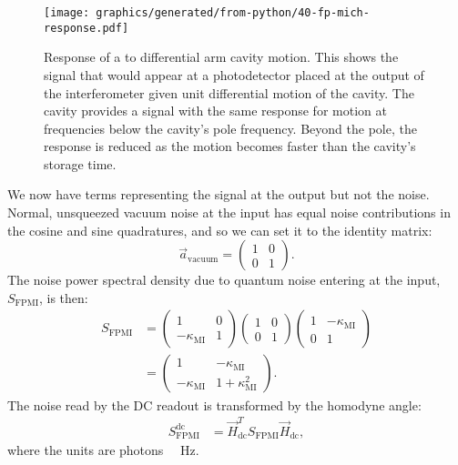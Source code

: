 \begin{figure}
  \centering
  \texttt{[image: graphics/generated/from-python/40-fp-mich-response.pdf]}
  \caption[Response of a \FPMI{} to differential arm cavity motion]{\label{fig:fp-mich-response}Response of a \FPMI{} to differential arm cavity motion. This shows the signal that would appear at a photodetector placed at the output of the interferometer given unit differential motion of the cavity. The cavity provides a signal with the same response for motion at frequencies below the cavity's pole frequency. Beyond the pole, the response is reduced as the motion becomes faster than the cavity's storage time.}
\end{figure}

We now have terms representing the signal at the output but not the noise. Normal, unsqueezed vacuum noise at the input has equal noise contributions in the cosine and sine quadratures, and so we can set it to the identity matrix:
\begin{equation}
  \label{eq:unsqueezed-vacuum-amplitude}
  \vec{a}_{\text{vacuum}} =
  \begin{pmatrix}
   1 & 0 \\
   0 & 1
  \end{pmatrix}.
\end{equation}
The noise power spectral density due to quantum noise entering at the input, $S_{\text{FPMI}}$, is then:
\begin{equation}
  \begin{split}
    S_{\text{FPMI}} &=
    \begin{pmatrix}
      1 & 0 \\
      -\kappa_{\text{MI}} & 1
    \end{pmatrix}
    \begin{pmatrix}
      1 & 0 \\
      0 & 1
    \end{pmatrix}
    \begin{pmatrix}
      1 & -\kappa_{\text{MI}} \\
      0 & 1
    \end{pmatrix} \\
    &=
    \begin{pmatrix}
      1 & -\kappa_{\text{MI}} \\
      -\kappa_{\text{MI}} & 1 + \kappa^2_{\text{MI}}
    \end{pmatrix}.
  \end{split}
\end{equation}
The noise read by the \gls{DC} readout is transformed by the homodyne angle:
\begin{equation}
  \begin{split}
    S_{\text{FPMI}}^{\text{dc}} &= \vec{H}_{\text{dc}}^{T} S_{\text{FPMI}} \vec{H}_{\text{dc}},
  \end{split}
\end{equation}
where the units are photons \SI{}{\per\hertz}.

